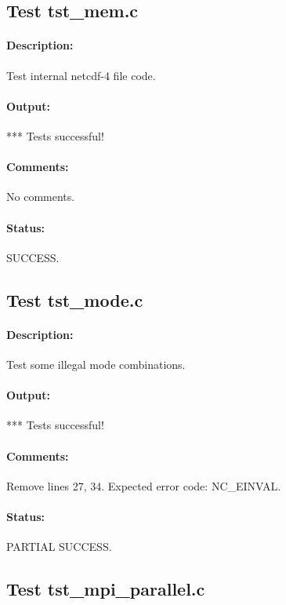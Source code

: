 \subsection{Test tst\_mem.c}

\paragraph{Description:} Test internal netcdf-4 file code.

\paragraph{Output:} *** Tests successful!

\paragraph{Comments:} No comments.

\paragraph{Status:} SUCCESS.

\subsection{Test tst\_mode.c}

\paragraph{Description:} Test some illegal mode combinations.

\paragraph{Output:} *** Tests successful!

\paragraph{Comments:} Remove lines 27, 34. Expected error code: NC\_EINVAL.

\paragraph{Status:} PARTIAL SUCCESS.

\subsection{Test tst\_mpi\_parallel.c}

